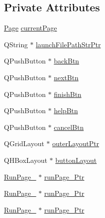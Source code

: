 \subsection*{Private Attributes}
\begin{DoxyCompactItemize}
\item 
\hyperlink{class_run_gui_acb4a3da6e31619ee4b0ac8c8f9cb64a3}{Page} \hyperlink{class_run_gui_a1d93e84df8a71767ca927554e5b0fe0d}{current\-Page}
\item 
Q\-String $\ast$ \hyperlink{class_run_gui_a3766ac7d4bfae38eb0d9f535f0d9bcf5}{launch\-File\-Path\-Str\-Ptr}
\item 
Q\-Push\-Button $\ast$ \hyperlink{class_run_gui_a5a79c5d8f3a61510c2be51738e428473}{back\-Btn}
\item 
Q\-Push\-Button $\ast$ \hyperlink{class_run_gui_a02bb63cd6c6d77933f98087111ce1a66}{next\-Btn}
\item 
Q\-Push\-Button $\ast$ \hyperlink{class_run_gui_a2989fde08a236488c152c8fa584c3380}{finish\-Btn}
\item 
Q\-Push\-Button $\ast$ \hyperlink{class_run_gui_a6c0a17f55049da888442fbc28dff7a78}{help\-Btn}
\item 
Q\-Push\-Button $\ast$ \hyperlink{class_run_gui_aa14d8877052e9cc11c93055561501792}{cancel\-Btn}
\item 
Q\-Grid\-Layout $\ast$ \hyperlink{class_run_gui_ae4cdc2ec0797c9121a47b9cdf3b93115}{outer\-Layout\-Ptr}
\item 
Q\-H\-Box\-Layout $\ast$ \hyperlink{class_run_gui_a812f0836d9eb5b0148cf92b61bc53be2}{button\-Layout}
\item 
\hyperlink{class_run_page__1}{Run\-Page\-\_} $\ast$ \hyperlink{class_run_gui_aa52f64156c00bbd4e14c46b8113e3072}{run\-Page\-\_\-Ptr}
\item 
\hyperlink{class_run_page__2}{Run\-Page\-\_} $\ast$ \hyperlink{class_run_gui_a86764c1a0c9629fbce62c7cb13c5ee07}{run\-Page\-\_\-Ptr}
\item 
\hyperlink{class_run_page__3}{Run\-Page\-\_} $\ast$ \hyperlink{class_run_gui_a7306b4df6c8619a98da052935a021cf8}{run\-Page\-\_\-Ptr}
\end{DoxyCompactItemize}


